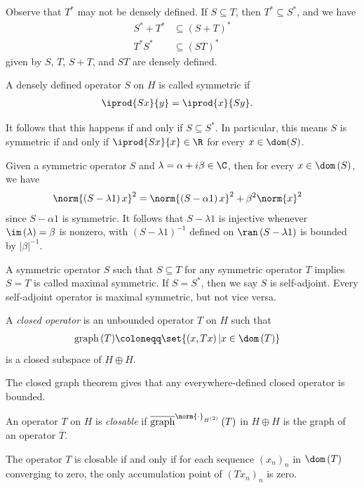 \documentclass[10pt]{mypackage}
\renewcommand{\coloneq}{\coloneqq}
\begin{document}
Observe that $T^{\ast}$ may not be densely defined. If $S\subseteq T$, then $T^{\ast}\subseteq S^{\ast}$, and we have
\begin{align*}
  S^{\ast} + T^{\ast} &\subseteq \left( S+T \right)^{\ast}\\
  T^{\ast}S^{\ast} &\subseteq \left( ST \right)^{\ast}
\end{align*}
given by $S$, $T$, $S + T$, and $ST$ are densely defined.
\begin{definition}
  A densely defined operator $S$ on $H$ is called symmetric if
  \begin{align*}
    \iprod{Sx}{y} &= \iprod{x}{Sy}.
  \end{align*}
\end{definition}
It follows that this happens if and only if $S\subseteq S^{\ast}$. In particular, this means $S$ is symmetric if and only if $ \iprod{Sx}{x}\in \R $ for every $x\in \dom(S)$.

Given a symmetric operator $S$ and $\lambda = \alpha + i\beta\in \C$, then for every $x\in \dom\left( S \right)$, we have
\begin{align*}
  \norm{\left( S-\lambda 1 \right)x}^2 &= \norm{\left( S-\alpha 1 \right)x}^2 + \beta^2\norm{x}^2
\end{align*}
since $S-\alpha 1$ is symmetric. It follows that $S-\lambda 1$ is injective whenever $\im\left( \lambda \right) = \beta$ is nonzero, with $\left( S-\lambda 1 \right)^{-1}$ defined on $\ran\left( S-\lambda 1 \right)$ is bounded by $\left\vert \beta \right\vert^{-1}$.

A symmetric operator $S$ such that $S\subseteq T$ for any symmetric operator $T$ implies $S = T$ is called maximal symmetric. If $S = S^{\ast}$, then we say $S$ is self-adjoint. Every self-adjoint operator is maximal symmetric, but not vice versa.
\begin{definition}
  A \textit{closed operator} is an unbounded operator $T$ on $H$ such that
  \begin{align*}
    \operatorname{graph}\left( T \right) &\coloneq \set{\left( x,Tx \right) | x\in \dom\left( T \right)}
  \end{align*}
  is a closed subspace of $H\oplus H$.
\end{definition}
The closed graph theorem gives that any everywhere-defined closed operator is bounded.
\begin{definition}
  An operator $T$ on $H$ is \textit{closable} if $ \overline{\operatorname{graph}}^{\norm{\cdot}_{H^{(2)}}}\left( T \right)$ in $H\oplus H$ is the graph of an operator $ \overline{T} $.
\end{definition}
The operator $T$ is closable if and only if for each sequence $\left( x_n \right)_n$ in $\dom\left( T \right)$ converging to zero, the only accumulation point of $\left( Tx_n \right)_{n}$ is zero.
\end{document}
